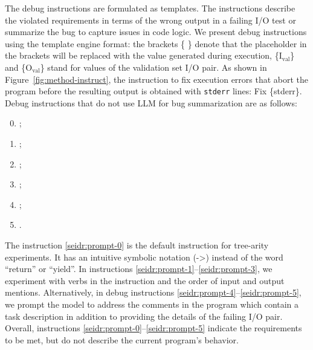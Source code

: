 The debug instructions are formulated as templates. The instructions describe the violated requirements in terms of the wrong output in a failing I/O test or summarize the bug to capture issues in code logic.
We present debug instructions using the template engine format: the brackets \{ \} denote that the placeholder in the brackets will be replaced with the value generated during execution, \{I$_{\text{val}}$\} and \{O$_{\text{val}}$\} stand for values of the validation set I/O pair.
As shown in Figure~\ref{fig:method-instruct}, the instruction to fix execution errors that abort the program before the resulting output is obtained with \texttt{stderr} lines: Fix \{stderr\}. 
Debug instructions that do not use LLM for bug summarization are as follows:
\begin{enumerate}[label=S\arabic*]
\setcounter{enumi}{-1}
    \item \label{seidr:prompt-0} ;
    \item \label{seidr:prompt-1} ;
    \item \label{seidr:prompt-2} ;
    \item \label{seidr:prompt-3} ;
    \item \label{seidr:prompt-4} 
    ;
    \item \label{seidr:prompt-5} .
\end{enumerate}

The instruction \ref{seidr:prompt-0} is the default instruction for tree-arity experiments. 
It has an intuitive symbolic notation (->) instead of the word ``return'' or ``yield''. 
In instructions \ref{seidr:prompt-1}--\ref{seidr:prompt-3}, we experiment with verbs in the instruction and the order of input and output mentions. 
Alternatively, in debug instructions \ref{seidr:prompt-4}--\ref{seidr:prompt-5}, we prompt the model to address the comments in the program which contain a task description in addition to providing the details of the failing I/O pair. 
Overall, instructions \ref{seidr:prompt-0}--\ref{seidr:prompt-5} indicate the requirements to be met, but do not describe the current program's behavior. 

